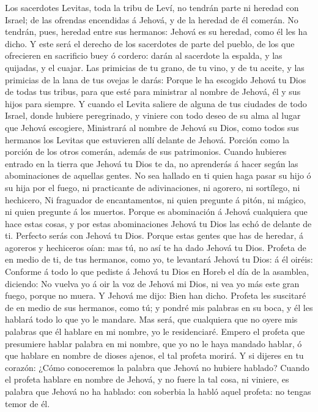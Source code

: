  Los sacerdotes Levitas, toda la tribu de Leví, no tendrán
parte ni heredad con Israel; de las ofrendas encendidas á Jehová, y de
la heredad de él comerán.  No tendrán, pues, heredad entre
sus hermanos: Jehová es su heredad, como él les ha dicho.  Y
este será el derecho de los sacerdotes de parte del pueblo, de los que
ofrecieren en sacrificio buey ó cordero: darán al sacerdote la espalda,
y las quijadas, y el cuajar.  Las primicias de tu grano, de
tu vino, y de tu aceite, y las primicias de la lana de tus ovejas le
darás:  Porque le ha escogido Jehová tu Dios de todas tus
tribus, para que esté para ministrar al nombre de Jehová, él y sus hijos
para siempre.  Y cuando el Levita saliere de alguna de tus
ciudades de todo Israel, donde hubiere peregrinado, y viniere con todo
deseo de su alma al lugar que Jehová escogiere,  Ministrará
al nombre de Jehová su Dios, como todos sus hermanos los Levitas que
estuvieren allí delante de Jehová.  Porción como la porción
de los otros comerán, además de sus patrimonios.  Cuando
hubieres entrado en la tierra que Jehová tu Dios te da, no aprenderás á
hacer según las abominaciones de aquellas gentes.  No sea
hallado en ti quien haga pasar su hijo ó su hija por el fuego, ni
practicante de adivinaciones, ni agorero, ni sortílego, ni hechicero,
 Ni fraguador de encantamentos, ni quien pregunte á pitón,
ni mágico, ni quien pregunte á los muertos.  Porque es
abominación á Jehová cualquiera que hace estas cosas, y por estas
abominaciones Jehová tu Dios las echó de delante de ti. 
Perfecto serás con Jehová tu Dios.  Porque estas gentes que
has de heredar, á agoreros y hechiceros oían: mas tú, no así te ha dado
Jehová tu Dios.  Profeta de en medio de ti, de tus
hermanos, como yo, te levantará Jehová tu Dios: á él oiréis:
 Conforme á todo lo que pediste á Jehová tu Dios en Horeb
el día de la asamblea, diciendo: No vuelva yo á oir la voz de Jehová mi
Dios, ni vea yo más este gran fuego, porque no muera.  Y
Jehová me dijo: Bien han dicho.  Profeta les suscitaré de
en medio de sus hermanos, como tú; y pondré mis palabras en su boca, y
él les hablará todo lo que yo le mandare.  Mas será, que
cualquiera que no oyere mis palabras que él hablare en mi nombre, yo le
residenciaré.  Empero el profeta que presumiere hablar
palabra en mi nombre, que yo no le haya mandado hablar, ó que hablare en
nombre de dioses ajenos, el tal profeta morirá.  Y si
dijeres en tu corazón: ¿Cómo conoceremos la palabra que Jehová no
hubiere hablado?  Cuando el profeta hablare en nombre de
Jehová, y no fuere la tal cosa, ni viniere, es palabra que Jehová no ha
hablado: con soberbia la habló aquel profeta: no tengas temor de él.

